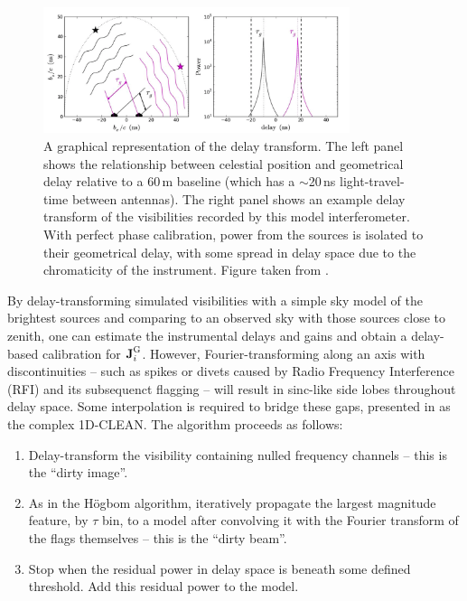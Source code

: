 \begin{figure}
\centering
\includegraphics[width=0.8\textwidth]{chapters/interferometry/figures/delay_space_Parsons12b.png}
\caption[A graphical representation of the delay transform.]{A graphical representation of the delay transform. The left panel shows the relationship between celestial position and geometrical delay relative to a 60\,m baseline (which has a $\sim$20\,ns light-travel-time between antennas). The right panel shows an example delay transform of the visibilities recorded by this model interferometer. With perfect phase calibration, power from the sources is isolated to their geometrical delay, with some spread in delay space due to the chromaticity of the instrument. Figure taken from \cite{Parsons.12a}.} 
\label{fig:delay_space_parsons12b}
\end{figure}

By delay-transforming simulated visibilities with a simple sky model of the brightest sources and comparing to an observed sky with those sources close to zenith, one can estimate the instrumental delays and gains and obtain a delay-based calibration for $\textbf{J}_i^{\rm G}$. However, Fourier-transforming along an axis with discontinuities -- such as spikes or divets caused by Radio Frequency Interference (RFI) and its subsequenct flagging -- will result in sinc-like side lobes throughout delay space. Some interpolation is required to bridge these gaps, presented in \cite{ParsonsBacker.09} as the complex 1D-CLEAN. The algorithm proceeds as follows:

\begin{enumerate}
\item Delay-transform the visibility containing nulled frequency channels -- this is the ``dirty image''.
\item As in the H{\"o}gbom algorithm, iteratively propagate the largest magnitude feature, by $\tau$ bin, to a model after convolving it with the Fourier transform of the flags themselves -- this is the ``dirty beam''.
\item Stop when the residual power in delay space is beneath some defined threshold. Add this residual power to the model.
\end{enumerate}

